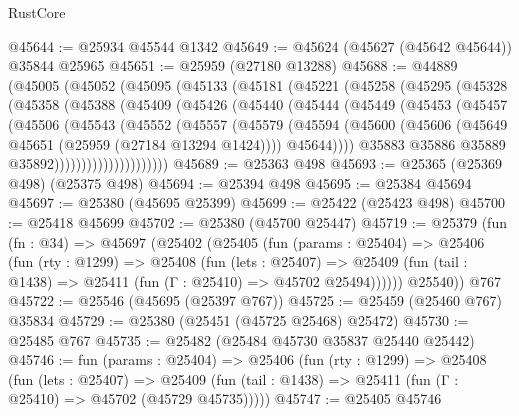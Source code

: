\begin{lexlean}{RustCore}
\begin{coremodule}
@45644 := @25934 @45544 @1342
@45649 := @45624 (@45627 (@45642 @45644)) @35844 @25965
@45651 := @25959 (@27180 @13288)
@45688 := @44889
    (@45005
      (@45052
        (@45095
          (@45133
            (@45181
              (@45221
                (@45258
                  (@45295
                    (@45328
                      (@45358
                        (@45388
                          (@45409
                            (@45426
                              (@45440
                                (@45444
                                  (@45449
                                    (@45453
                                      (@45457
                                        (@45506
                                          (@45543
                                            (@45552
                                              (@45557
                                                (@45579
                                                  (@45594
                                                    (@45600
                                                      (@45606
                                                        (@45649
                                                          @45651
                                                          (@25959 (@27184 @13294 @1424))))
                                                      @45644))))
                                              @35883
                                              @35886
                                              @35889
                                              @35892)))))))))))))))))))))
@45689 := @25363 @498
@45693 := @25365 (@25369 @498) (@25375 @498)
@45694 := @25394 @498
@45695 := @25384 @45694
@45697 := @25380 (@45695 @25399)
@45699 := @25422 (@25423 @498)
@45700 := @25418 @45699
@45702 := @25380 (@45700 @25447)
@45719 := @25379
    (fun (fn : @34) =>
    @45697
      (@25402
        (@25405
          (fun (params : @25404) =>
          @25406
            (fun (rty : @1299) =>
            @25408
              (fun (lets : @25407) =>
              @25409 (fun (tail : @1438) => @25411 (fun (Γ : @25410) => @45702 @25494))))))
        @25540))
    @767
@45722 := @25546 (@45695 (@25397 @767))
@45725 := @25459 (@25460 @767) @35834
@45729 := @25380 (@25451 (@45725 @25468) @25472)
@45730 := @25485 @767
@45735 := @25482 (@25484 @45730 @35837 @25440 @25442)
@45746 := fun (params : @25404) =>
  @25406
    (fun (rty : @1299) =>
    @25408
      (fun (lets : @25407) =>
      @25409 (fun (tail : @1438) => @25411 (fun (Γ : @25410) => @45702 (@45729 @45735)))))
@45747 := @25405 @45746

\end{coremodule}
\end{lexlean}

